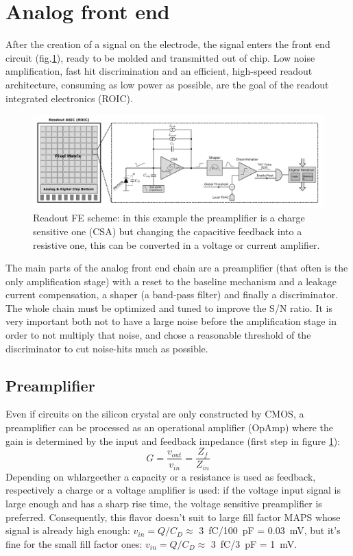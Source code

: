 \section{Analog front end}
   After the creation of a signal on the electrode, the signal enters the front end circuit (fig.\ref{fig:readout_scheme}), ready to be molded and transmitted out of chip. Low noise amplification, fast hit discrimination and an efficient, high-speed readout architecture, consuming as low power as possible, are the goal of the readout integrated electronics (ROIC).
   \begin{figure}
      \centering
      \includegraphics[width=1.\linewidth]{figures/Pixel_detectors/readout_scheme.png}
      \caption{Readout FE scheme: in this example the preamplifier is a charge sensitive one (CSA) but changing the capacitive feedback into a resistive one, this can be converted in a voltage or current amplifier.}
      \label{fig:readout_scheme}
   \end{figure}
   The main parts of the analog front end chain are a preamplifier (that often is the only amplification stage) with a reset to the baseline mechanism and a leakage current compensation, a shaper (a band-pass filter) and finally a discriminator. The whole chain must be optimized and tuned to improve the S/N ratio. It is very important both not to have a large noise before the amplification stage in order to not multiply that noise, and chose a reasonable threshold of the discriminator to cut noise-hits much as possible.

   \subsection{Preamplifier}\label{subsec:preamplifier}
      Even if circuits on the silicon crystal are only constructed by CMOS, a preamplifier can be processed as an operational amplifier (OpAmp) where the gain is determined by the input and feedback impedance (first step in figure \ref{fig:readout_scheme}):
      \begin{equation}
         G = \frac{v_{out}}{v_{in}} = \frac{Z_{f}}{Z_{in}}
      \end{equation}
      Depending on whlargeether a capacity or a resistance is used as feedback, respectively a charge or a voltage amplifier is used: if the voltage input signal is large enough and has a sharp rise time, the voltage sensitive preamplifier is preferred. Consequently, this flavor doesn't suit to large fill factor MAPS whose signal is already high enough: $v_{in} = Q/C_{D} \approx$ \SI{3}{fC}/\SI{100}{pF} = \SI{0.03}{mV}, but it's fine for the small fill factor ones: $v_{in} = Q/C_{D} \approx$ \SI{3}{fC}/\SI{3}{pF} = \SI{1}{mV}.


